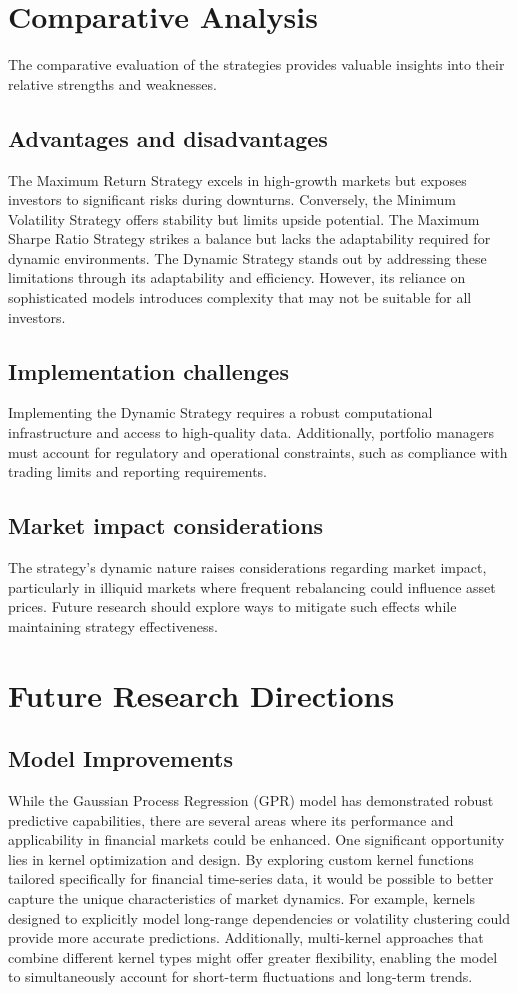 \section{Comparative Analysis}
The comparative evaluation of the strategies provides valuable insights into their relative strengths and weaknesses.


\subsection{Advantages and disadvantages}
The Maximum Return Strategy excels in high-growth markets but exposes investors to significant risks during downturns. Conversely, the Minimum Volatility Strategy offers stability but limits upside potential. The Maximum Sharpe Ratio Strategy strikes a balance but lacks the adaptability required for dynamic environments.
The Dynamic Strategy stands out by addressing these limitations through its adaptability and efficiency. However, its reliance on sophisticated models introduces complexity that may not be suitable for all investors.
\subsection{Implementation challenges}
Implementing the Dynamic Strategy requires a robust computational infrastructure and access to high-quality data. Additionally, portfolio managers must account for regulatory and operational constraints, such as compliance with trading limits and reporting requirements.
\subsection{Market impact considerations}

The strategy's dynamic nature raises considerations regarding market impact, particularly in illiquid markets where frequent rebalancing could influence asset prices. Future research should explore ways to mitigate such effects while maintaining strategy effectiveness.

\section{Future Research Directions}

\subsection{Model Improvements}
While the Gaussian Process Regression (GPR) model has demonstrated robust predictive capabilities, there are several areas where its performance and applicability in financial markets could be enhanced. One significant opportunity lies in kernel optimization and design. By exploring custom kernel functions tailored specifically for financial time-series data, it would be possible to better capture the unique characteristics of market dynamics. For example, kernels designed to explicitly model long-range dependencies or volatility clustering could provide more accurate predictions. Additionally, multi-kernel approaches that combine different kernel types might offer greater flexibility, enabling the model to simultaneously account for short-term fluctuations and long-term trends.

